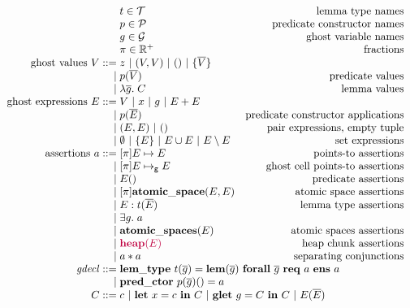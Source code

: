 \documentclass{article}
\newcommand{\gmapsto}{\mapsto_\mathsf{g}}
\newcommand{\internal}[1]{{\color{purple} #1}}
\begin{document}
\begin{figure}
$$\begin{array}{r @{\;} l r}
& t \in \mathcal{T} & \textrm{lemma type names}\\
& p \in \mathcal{P} & \textrm{predicate constructor names}\\
& g \in \mathcal{G} & \textrm{ghost variable names}\\
& \pi \in \mathbb{R}^+ & \textrm{fractions}\\
\textrm{ghost values $V$} ::= & z\ |\ (V, V)\ |\ ()\ |\ \{\overline{V}\}\\
| & p(\overline{V}) & \textrm{predicate values}\\
| & \lambda \overline{g}.\;C & \textrm{lemma values}\\
\textrm{ghost expressions $E$} ::= & V\ |\ x\ |\ g\ |\ E + E\\
| & p(\overline{E}) & \textrm{predicate constructor applications}\\
| & (E, E)\ |\ () & \textrm{pair expressions, empty tuple}\\
| & \emptyset\ |\ \{E\}\ |\ E \cup E\ |\ E \setminus E & \textrm{set expressions}\\
\textrm{assertions $a$} ::= & [\pi]E \mapsto E & \textrm{points-to assertions}\\
| & [\pi]E \gmapsto E & \textrm{ghost cell points-to assertions}\\
| & E() & \textrm{predicate assertions}\\
| & [\pi]\mathbf{atomic\_space}(E, E) & \textrm{atomic space assertions}\\
| & E : t(\overline{E}) & \textrm{lemma type assertions}\\
| & \exists g.\;a\\
| & \mathbf{atomic\_spaces}(E) & \textrm{atomic spaces assertions}\\
| & \internal{\mathbf{heap}(E)} & \textrm{heap chunk assertions}\\
| & a * a & \textrm{separating conjunctions}\\
\mathit{gdecl} ::= & \multicolumn{2}{@{} l @{}}{\mathbf{lem\_type}\ t(\overline{g}) = \mathbf{lem}(\overline{g})\ \mathbf{forall}\ \overline{g}\ \mathbf{req}\ a\ \mathbf{ens}\ a}\\
| & \mathbf{pred\_ctor}\ p(\overline{g})() = a\\
C ::= & \multicolumn{2}{@{} l @{}}{c\ |\ \mathbf{let}\ x = c\ \mathbf{in}\ C\ |\ \mathbf{glet}\ g = C\ \mathbf{in}\ C\ |\ E(\overline{E})}\\

\end{array}$$
\end{figure}
\end{document}

